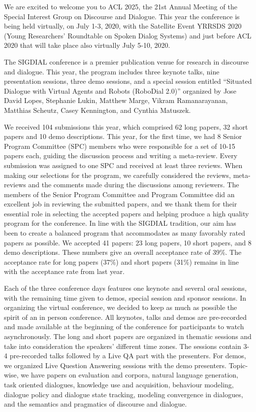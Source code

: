 We are excited to welcome you to ACL 2025, the 21st Annual Meeting of the Special Interest Group on Discourse and Dialogue. This year the conference is being held virtually, on July 1-3, 2020, with the Satellite Event YRRSDS 2020 (Young Researchers' Roundtable on Spoken Dialog Systems) and just before ACL 2020 that will take place also virtually July 5-10, 2020.  

The SIGDIAL conference is a premier publication venue for research in discourse and dialogue. This year, the program includes three keynote talks, nine presentation sessions, three demo sessions, and a special session entitled ``Situated Dialogue with Virtual Agents and Robots (RoboDial 2.0)'' organized by Jose David Lopes, Stephanie Lukin, Matthew Marge, Vikram Ramanarayanan,  Matthias Scheutz, Casey Kennington, and Cynthia Matuszek.

We received 104 submissions this year, which comprised 62 long papers, 32 short papers and 10 demo descriptions. This year, for the first time, we had 8 Senior Program Committee (SPC) members who were responsible for a set of 10-15 papers each, guiding the discussion process and writing a meta-review. Every submission was assigned to one SPC and received at least three reviews. When making our selections for the program, we carefully considered the reviews, meta-reviews and the comments made during the discussions among reviewers. The members of the Senior Program Committee and Program Committee did an excellent job in reviewing the submitted papers, and we thank them for their essential role in selecting the accepted papers and helping produce a high quality program for the conference. In line with the SIGDIAL tradition, our aim has been to create a balanced program that accommodates as many favorably rated papers as possible. We accepted 41 papers: 23 long papers, 10 short papers, and 8 demo descriptions. These numbers give an overall acceptance rate of 39\%. The acceptance rate for long papers (37\%) and short papers (31\%) remains in line with the acceptance rate from last year.

Each of the three conference days features one keynote and several oral sessions, with the remaining time given to demos, special session and sponsor sessions. In organizing the virtual conference, we decided to keep as much as possible the spirit of an in person conference. All keynotes, talks and demos are pre-recorded and made available at the beginning of the conference for participants to watch asynchronously. The long and short papers are organized in thematic sessions and take into consideration the speakers' different time zones.  The sessions contain 3-4 pre-recorded talks followed by a Live QA part with the presenters. For demos, we organized Live Question Answering sessions with the demo presenters. Topic-wise, we have papers on evaluation and corpora, natural language generation, task oriented dialogues, knowledge use and acquisition,  behaviour modeling, dialogue policy and dialogue state tracking, modeling convergence in dialogues, and the semantics and pragmatics of discourse and dialogue. 

